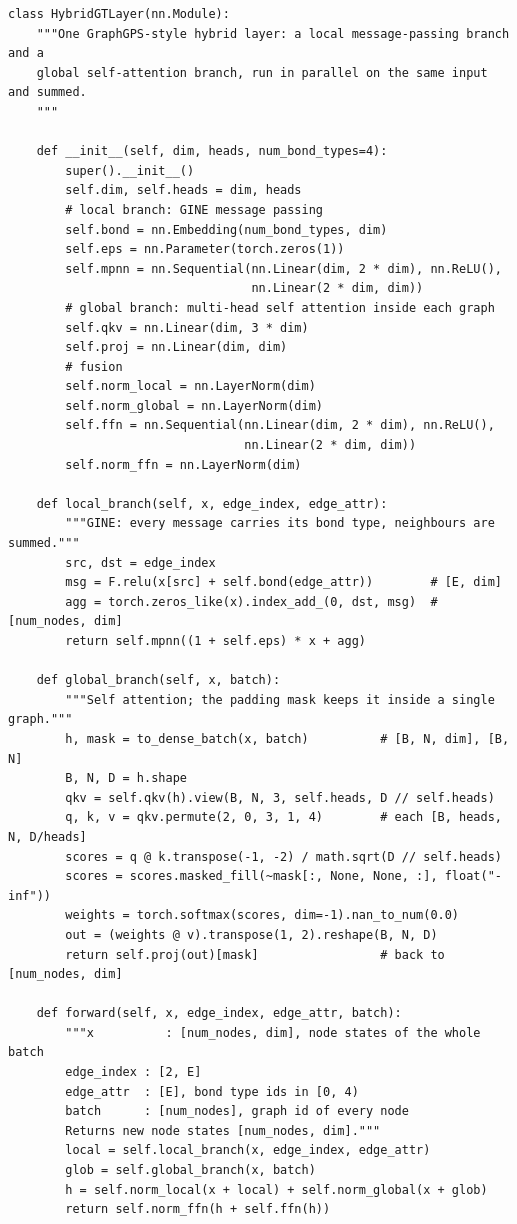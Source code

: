 \begin{lstlisting}[style=p2python]
class HybridGTLayer(nn.Module):
    """One GraphGPS-style hybrid layer: a local message-passing branch and a
    global self-attention branch, run in parallel on the same input and summed.
    """

    def __init__(self, dim, heads, num_bond_types=4):
        super().__init__()
        self.dim, self.heads = dim, heads
        # local branch: GINE message passing
        self.bond = nn.Embedding(num_bond_types, dim)
        self.eps = nn.Parameter(torch.zeros(1))
        self.mpnn = nn.Sequential(nn.Linear(dim, 2 * dim), nn.ReLU(),
                                  nn.Linear(2 * dim, dim))
        # global branch: multi-head self attention inside each graph
        self.qkv = nn.Linear(dim, 3 * dim)
        self.proj = nn.Linear(dim, dim)
        # fusion
        self.norm_local = nn.LayerNorm(dim)
        self.norm_global = nn.LayerNorm(dim)
        self.ffn = nn.Sequential(nn.Linear(dim, 2 * dim), nn.ReLU(),
                                 nn.Linear(2 * dim, dim))
        self.norm_ffn = nn.LayerNorm(dim)

    def local_branch(self, x, edge_index, edge_attr):
        """GINE: every message carries its bond type, neighbours are summed."""
        src, dst = edge_index
        msg = F.relu(x[src] + self.bond(edge_attr))        # [E, dim]
        agg = torch.zeros_like(x).index_add_(0, dst, msg)  # [num_nodes, dim]
        return self.mpnn((1 + self.eps) * x + agg)

    def global_branch(self, x, batch):
        """Self attention; the padding mask keeps it inside a single graph."""
        h, mask = to_dense_batch(x, batch)          # [B, N, dim], [B, N]
        B, N, D = h.shape
        qkv = self.qkv(h).view(B, N, 3, self.heads, D // self.heads)
        q, k, v = qkv.permute(2, 0, 3, 1, 4)        # each [B, heads, N, D/heads]
        scores = q @ k.transpose(-1, -2) / math.sqrt(D // self.heads)
        scores = scores.masked_fill(~mask[:, None, None, :], float("-inf"))
        weights = torch.softmax(scores, dim=-1).nan_to_num(0.0)
        out = (weights @ v).transpose(1, 2).reshape(B, N, D)
        return self.proj(out)[mask]                 # back to [num_nodes, dim]

    def forward(self, x, edge_index, edge_attr, batch):
        """x          : [num_nodes, dim], node states of the whole batch
        edge_index : [2, E]
        edge_attr  : [E], bond type ids in [0, 4)
        batch      : [num_nodes], graph id of every node
        Returns new node states [num_nodes, dim]."""
        local = self.local_branch(x, edge_index, edge_attr)
        glob = self.global_branch(x, batch)
        h = self.norm_local(x + local) + self.norm_global(x + glob)
        return self.norm_ffn(h + self.ffn(h))
\end{lstlisting}

